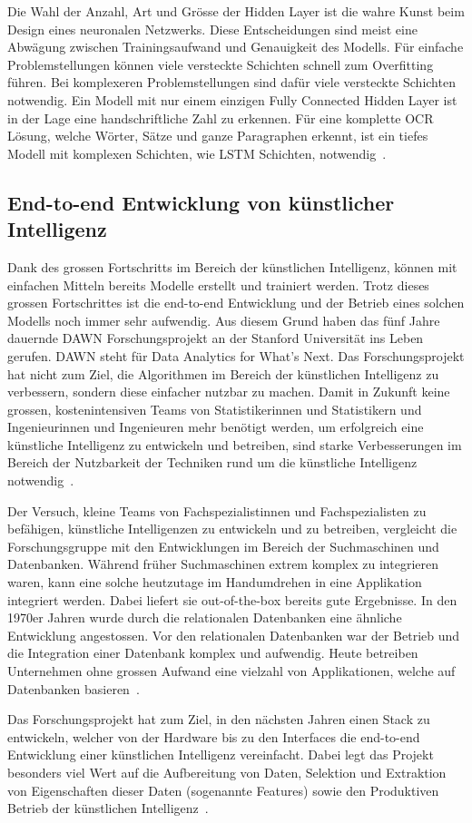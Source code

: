Die Wahl der Anzahl, Art und Grösse der Hidden Layer ist die wahre Kunst beim Design eines neuronalen Netzwerks. Diese Entscheidungen sind meist eine Abwägung zwischen Trainingsaufwand und Genauigkeit des Modells. Für einfache Problemstellungen können viele versteckte Schichten schnell zum Overfitting führen. Bei komplexeren Problemstellungen sind dafür viele versteckte Schichten notwendig. Ein Modell mit nur einem einzigen Fully Connected Hidden Layer ist in der Lage eine handschriftliche Zahl zu erkennen. Für eine komplette OCR Lösung, welche Wörter, Sätze und ganze Paragraphen erkennt, ist ein tiefes Modell mit komplexen Schichten, wie LSTM Schichten, notwendig~\autocite{NNDesign}.

\subsection{End-to-end Entwicklung von künstlicher Intelligenz}
\label{chap:DAWN}

Dank des grossen Fortschritts im Bereich der künstlichen Intelligenz, können mit einfachen Mitteln bereits Modelle erstellt und trainiert werden. Trotz dieses grossen Fortschrittes ist die end-to-end Entwicklung und der Betrieb eines solchen Modells noch immer sehr aufwendig. Aus diesem Grund haben \textcite{DAWN} das fünf Jahre dauernde DAWN Forschungsprojekt an der Stanford Universität ins Leben gerufen. DAWN steht für Data Analytics for What's Next. Das Forschungsprojekt hat nicht zum Ziel, die Algorithmen im Bereich der künstlichen Intelligenz zu verbessern, sondern diese einfacher nutzbar zu machen. Damit in Zukunft keine grossen, kostenintensiven Teams von Statistikerinnen und Statistikern und Ingenieurinnen und Ingenieuren mehr benötigt werden, um erfolgreich eine künstliche Intelligenz zu entwickeln und betreiben, sind starke Verbesserungen im Bereich der Nutzbarkeit der Techniken rund um die künstliche Intelligenz notwendig~\autocite{DAWN}.

Der Versuch, kleine Teams von Fachspezialistinnen und Fachspezialisten zu befähigen, künstliche Intelligenzen zu entwickeln und zu betreiben, vergleicht die Forschungsgruppe mit den Entwicklungen im Bereich der Suchmaschinen und Datenbanken. Während früher Suchmaschinen extrem komplex zu integrieren waren, kann eine solche heutzutage im Handumdrehen in eine Applikation integriert werden. Dabei liefert sie out-of-the-box bereits gute Ergebnisse. In den 1970er Jahren wurde durch die relationalen Datenbanken eine ähnliche Entwicklung angestossen. Vor den relationalen Datenbanken war der Betrieb und die Integration einer Datenbank komplex und aufwendig. Heute betreiben Unternehmen ohne grossen Aufwand eine vielzahl von Applikationen, welche auf Datenbanken basieren~\autocite{DAWN}.

Das Forschungsprojekt hat zum Ziel, in den nächsten Jahren einen Stack zu entwickeln, welcher von der Hardware bis zu den Interfaces die end-to-end Entwicklung einer künstlichen Intelligenz vereinfacht. Dabei legt das Projekt besonders viel Wert auf die Aufbereitung von Daten, Selektion und Extraktion von Eigenschaften dieser Daten (sogenannte Features) sowie den Produktiven Betrieb der künstlichen Intelligenz~\autocite{DAWN}.
